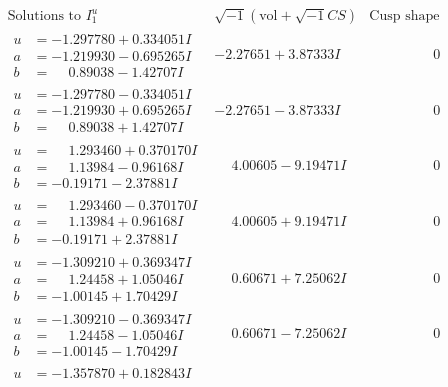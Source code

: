 \documentclass[1p]{elsarticle_modified}
\theoremstyle{definition}
\newcommand{\I}{\sqrt{-1}}
\begin{document}
$$\begin{array}{c|c|c}
\text{Solutions to }I^u_{1}& \I (\text{vol} + \sqrt{-1}CS) & \text{Cusp shape}\\
 \hline 
\begin{aligned}
u &= -1.297780 + 0.334051 I \\
a &= -1.219930 - 0.695265 I \\
b &= \phantom{-}0.89038 - 1.42707 I\end{aligned}
 & -2.27651 + 3.87333 I & \phantom{-0.000000 } 0 \\ \hline\begin{aligned}
u &= -1.297780 - 0.334051 I \\
a &= -1.219930 + 0.695265 I \\
b &= \phantom{-}0.89038 + 1.42707 I\end{aligned}
 & -2.27651 - 3.87333 I & \phantom{-0.000000 } 0 \\ \hline\begin{aligned}
u &= \phantom{-}1.293460 + 0.370170 I \\
a &= \phantom{-}1.13984 - 0.96168 I \\
b &= -0.19171 - 2.37881 I\end{aligned}
 & \phantom{-}4.00605 - 9.19471 I & \phantom{-0.000000 } 0 \\ \hline\begin{aligned}
u &= \phantom{-}1.293460 - 0.370170 I \\
a &= \phantom{-}1.13984 + 0.96168 I \\
b &= -0.19171 + 2.37881 I\end{aligned}
 & \phantom{-}4.00605 + 9.19471 I & \phantom{-0.000000 } 0 \\ \hline\begin{aligned}
u &= -1.309210 + 0.369347 I \\
a &= \phantom{-}1.24458 + 1.05046 I \\
b &= -1.00145 + 1.70429 I\end{aligned}
 & \phantom{-}0.60671 + 7.25062 I & \phantom{-0.000000 } 0 \\ \hline\begin{aligned}
u &= -1.309210 - 0.369347 I \\
a &= \phantom{-}1.24458 - 1.05046 I \\
b &= -1.00145 - 1.70429 I\end{aligned}
 & \phantom{-}0.60671 - 7.25062 I & \phantom{-0.000000 } 0 \\ \hline\begin{aligned}
u &= -1.357870 + 0.182843 I \\

\end{aligned}
\end{array}$$
\end{document}
